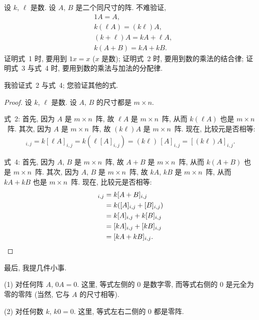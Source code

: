 设 \(k\), \(\ell\) 是数.
设 \(A\), \(B\) 是二个同尺寸的阵.
不难验证,
\begin{align*}
     & 1A = A,                     \\
     & k(\ell A) = (k\ell) A,      \\
     & (k + \ell) A = kA + \ell A, \\
     & k(A + B) = kA + kB.
\end{align*}
证明式~1 时, 要用到 \(1x = x\) (\(x\) 是数);
证明式~2 时, 要用到数的乘法的结合律;
证明式~3 与式~4 时, 要用到数的乘法与加法的分配律.

我验证式~2 与式~4;
您验证其他的式.

\begin{proof}
    设 \(k\), \(\ell\) 是数.
    设 \(A\), \(B\) 的尺寸都是 \(m \times n\).

    式~2:
    首先, 因为 \(A\) 是 \(m \times n\)~阵,
    故 \(\ell A\) 是 \(m \times n\)~阵,
    从而 \(k(\ell A)\) 也是 \(m \times n\)~阵.
    其次, 因为 \(A\) 是 \(m \times n\)~阵,
    故 \((k\ell) A\) 是 \(m \times n\)~阵.
    现在, 比较元是否相等:
    \begin{align*}
        [k(\ell A)]_{i,j}
        = k[\ell A]_{i,j}
        = k(\ell [A]_{i,j})
        = (k\ell)\, [A]_{i,j}
            = [(k\ell) A]_{i,j}.
    \end{align*}

    式~4:
    首先, 因为 \(A\), \(B\) 是 \(m \times n\)~阵,
    故 \(A + B\) 是 \(m \times n\)~阵,
    从而 \(k(A + B)\) 也是 \(m \times n\)~阵.
    其次, 因为 \(A\), \(B\) 是 \(m \times n\)~阵,
    故 \(kA\), \(kB\) 是 \(m \times n\)~阵,
    从而 \(kA + kB\) 也是 \(m \times n\)~阵.
    现在, 比较元是否相等:
    \begin{align*}
        [k(A + B)]_{i,j}
        = {} & k[A + B]_{i,j}           \\
        = {} & k([A]_{i,j} + [B]_{i,j}) \\
        = {} & k[A]_{i,j} + k[B]_{i,j}  \\
        = {} & [kA]_{i,j} + [kB]_{i,j}  \\
        = {} & [kA + kB]_{i,j}.
        \qedhere
    \end{align*}
\end{proof}

最后, 我提几件小事.

(1)
对任何阵 \(A\), \(0A = 0\).
这里, 等式左侧的 \(0\) 是数字零,
而等式右侧的 \(0\) 是元全为零的零阵
(当然, 它与 \(A\) 的尺寸相等).

(2)
对任何数 \(k\), \(k0 = 0\).
这里, 等式左右二侧的 \(0\) 都是零阵.

